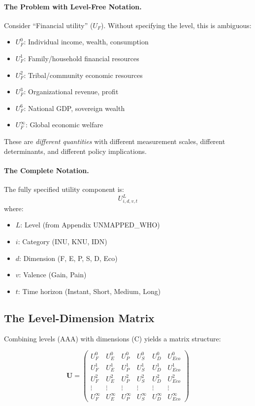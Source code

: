 \paragraph{The Problem with Level-Free Notation.}

Consider ``Financial utility'' ($U_F$). Without specifying the level, this is ambiguous:

\begin{itemize}[nosep]
\item $U^0_F$: Individual income, wealth, consumption
\item $U^1_F$: Family/household financial resources
\item $U^2_F$: Tribal/community economic resources
\item $U^3_F$: Organizational revenue, profit
\item $U^6_F$: National GDP, sovereign wealth
\item $U^{\infty}_F$: Global economic welfare
\end{itemize}

These are \textit{different quantities} with different measurement scales, different 
determinants, and different policy implications.

\paragraph{The Complete Notation.}

The fully specified utility component is:
\begin{equation}
U^L_{i,d,v,t}
\end{equation}
where:
\begin{itemize}[nosep]
\item $L$: Level (from Appendix UNMAPPED_WHO)
\item $i$: Category (INU, KNU, IDN)
\item $d$: Dimension (F, E, P, S, D, Eco)
\item $v$: Valence (Gain, Pain)
\item $t$: Time horizon (Instant, Short, Medium, Long)
\end{itemize}

\subsection{The Level-Dimension Matrix}

Combining levels (AAA) with dimensions (C) yields a matrix structure:

\begin{equation}
\mathbf{U} = \begin{pmatrix}
U^0_F & U^0_E & U^0_P & U^0_S & U^0_D & U^0_{Eco} \\
U^1_F & U^1_E & U^1_P & U^1_S & U^1_D & U^1_{Eco} \\
U^2_F & U^2_E & U^2_P & U^2_S & U^2_D & U^2_{Eco} \\
\vdots & \vdots & \vdots & \vdots & \vdots & \vdots \\
U^{\infty}_F & U^{\infty}_E & U^{\infty}_P & U^{\infty}_S & U^{\infty}_D & U^{\infty}_{Eco}
\end{pmatrix}
\end{equation}

